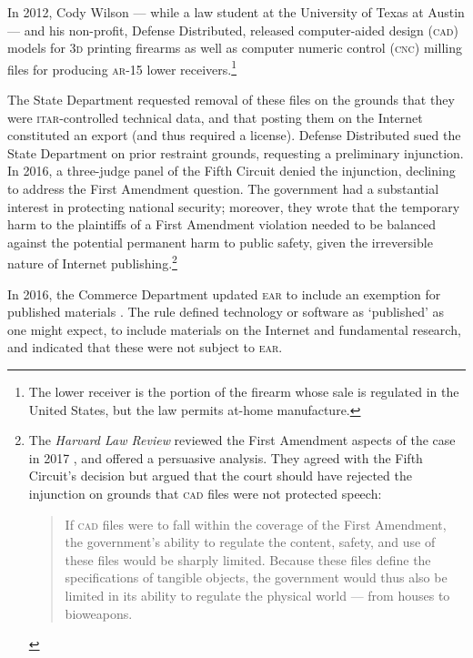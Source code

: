 \documentclass[preprint,twocolumn,5p]{elsarticle}
\begin{document}
In 2012, Cody Wilson --- while a law student at the University of Texas at Austin --- and his non-profit, Defense Distributed, released computer-aided design (\textsc{cad}) models for \textsc{3d} printing firearms as well as computer numeric control (\textsc{cnc}) milling files for producing \textsc{ar}-15 lower receivers.\footnote{The lower receiver is the portion of the firearm whose sale is regulated in the United States, but the law permits at-home manufacture.}

The State Department requested removal of these files on the grounds that they were \textsc{itar}-controlled technical data, and that posting them on the Internet constituted an export (and thus required a license). Defense Distributed sued the State Department on prior restraint grounds, requesting a preliminary injunction. In 2016, a three-judge panel of the Fifth Circuit denied the injunction, declining to address the First Amendment question. The government had a substantial interest in protecting national security; moreover, they wrote that the temporary harm to the plaintiffs of a First Amendment violation needed to be balanced against the potential permanent harm to public safety, given the irreversible nature of Internet publishing.\footnote{The \textit{Harvard Law Review} reviewed the First Amendment aspects of the  case in 2017 \citep{Harvard2017}, and offered a persuasive analysis. They agreed with the Fifth Circuit's decision but argued that the court should have rejected the injunction on grounds that \textsc{cad} files were not protected speech:
\begin{quote}
If \textsc{cad} files were to fall within the coverage of the First Amendment, the government's ability to regulate the content, safety, and use of these files would be sharply limited. Because these files define the specifications of tangible objects, the government would thus also be limited in its ability to regulate the physical world --- from houses to bioweapons.
\end{quote}} \citep{DefenseDistributed2016}

In 2016, the Commerce Department updated \textsc{ear} to include an exemption for published materials \citep{PublishedRule2016}. The rule defined technology or software as `published' as one might expect, to include materials on the Internet and fundamental research, and indicated that these were not subject to \textsc{ear}.
\end{document}
